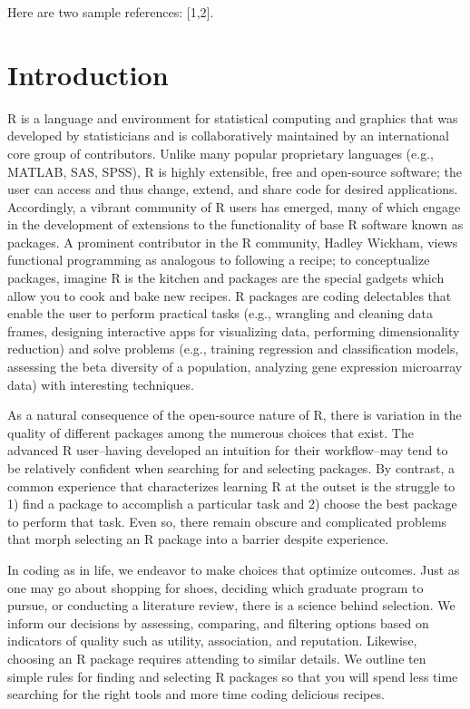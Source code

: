 \documentclass[10pt,letterpaper]{article}
\begin{document}
Here are two sample references: {[}1,2{]}.

\hypertarget{introduction-1}{%
\section{Introduction}\label{introduction-1}}

R is a language and environment for statistical computing and graphics
that was developed by statisticians and is collaboratively maintained by
an international core group of contributors. Unlike many popular
proprietary languages (e.g., MATLAB, SAS, SPSS), R is highly extensible,
free and open-source software; the user can access and thus change,
extend, and share code for desired applications. Accordingly, a vibrant
community of R users has emerged, many of which engage in the
development of extensions to the functionality of base R software known
as packages. A prominent contributor in the R community, Hadley Wickham,
views functional programming as analogous to following a recipe; to
conceptualize packages, imagine R is the kitchen and packages are the
special gadgets which allow you to cook and bake new recipes. R packages
are coding delectables that enable the user to perform practical tasks
(e.g., wrangling and cleaning data frames, designing interactive apps
for visualizing data, performing dimensionality reduction) and solve
problems (e.g., training regression and classification models, assessing
the beta diversity of a population, analyzing gene expression microarray
data) with interesting techniques.

As a natural consequence of the open-source nature of R, there is
variation in the quality of different packages among the numerous
choices that exist. The advanced R user--having developed an intuition
for their workflow--may tend to be relatively confident when searching
for and selecting packages. By contrast, a common experience that
characterizes learning R at the outset is the struggle to 1) find a
package to accomplish a particular task and 2) choose the best package
to perform that task. Even so, there remain obscure and complicated
problems that morph selecting an R package into a barrier despite
experience.

In coding as in life, we endeavor to make choices that optimize
outcomes. Just as one may go about shopping for shoes, deciding which
graduate program to pursue, or conducting a literature review, there is
a science behind selection. We inform our decisions by assessing,
comparing, and filtering options based on indicators of quality such as
utility, association, and reputation. Likewise, choosing an R package
requires attending to similar details. We outline ten simple rules for
finding and selecting R packages so that you will spend less time
searching for the right tools and more time coding delicious recipes.
\end{document}
